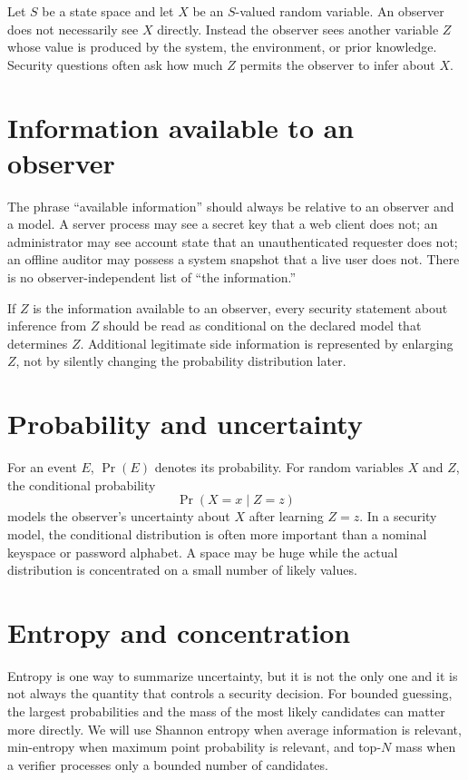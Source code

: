 \documentclass[11pt,oneside]{book}
\theoremstyle{definition}
\theoremstyle{remark}
\newcommand{\Prb}{\operatorname{Pr}}
\begin{document}
Let $S$ be a state space and let $X$ be an $S$-valued random variable. An observer does not necessarily see $X$ directly. Instead the observer sees another variable $Z$ whose value is produced by the system, the environment, or prior knowledge. Security questions often ask how much $Z$ permits the observer to infer about $X$.

\section{Information available to an observer}
\label{sec:observer-info}
The phrase ``available information'' should always be relative to an observer and a model. A server process may see a secret key that a web client does not; an administrator may see account state that an unauthenticated requester does not; an offline auditor may possess a system snapshot that a live user does not. There is no observer-independent list of ``the information.''

If $Z$ is the information available to an observer, every security statement about inference from $Z$ should be read as conditional on the declared model that determines $Z$. Additional legitimate side information is represented by enlarging $Z$, not by silently changing the probability distribution later.

\section{Probability and uncertainty}
For an event $E$, $\Prb(E)$ denotes its probability. For random variables $X$ and $Z$, the conditional probability
\[
\Prb(X=x\mid Z=z)
\]
models the observer's uncertainty about $X$ after learning $Z=z$. In a security model, the conditional distribution is often more important than a nominal keyspace or password alphabet. A space may be huge while the actual distribution is concentrated on a small number of likely values.

\section{Entropy and concentration}
Entropy is one way to summarize uncertainty, but it is not the only one and it is not always the quantity that controls a security decision. For bounded guessing, the largest probabilities and the mass of the most likely candidates can matter more directly. We will use Shannon entropy when average information is relevant, min-entropy when maximum point probability is relevant, and top-$N$ mass when a verifier processes only a bounded number of candidates.
\end{document}
